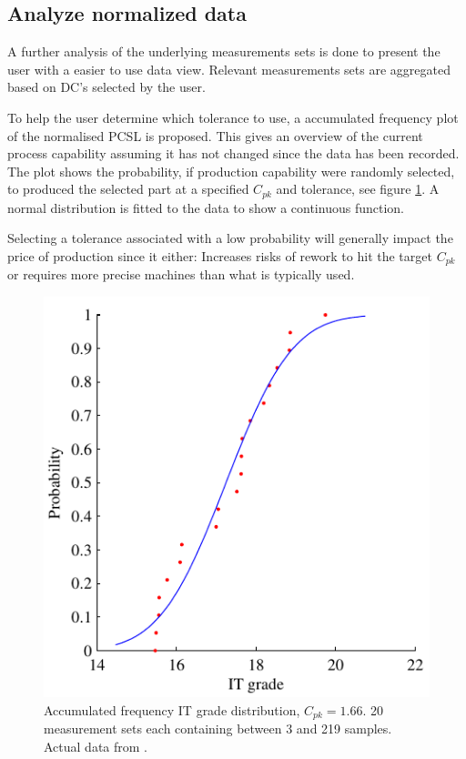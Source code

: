 \documentclass[aip,amsmath, reprint, author-year]{revtex4-1}
\begin{document}
\subsection{Analyze normalized data}
A further analysis of the underlying measurements sets is done to present the user with a easier to use data view. Relevant measurements sets are aggregated based on DC's selected by the user. 

To help the user determine which tolerance to use, a accumulated frequency plot of the normalised PCSL is proposed. 
This gives an overview of the current process capability assuming it has not changed since the data has been recorded. 
The plot shows the probability, if production capability were randomly selected, to produced the selected part at a specified $C_{pk}$ and tolerance, see figure \ref{fig:acumfreq}. 
A normal distribution is fitted to the data to show a continuous function.

Selecting a tolerance associated with a low probability will generally impact the price of production since it either: Increases risks of rework to hit the target $C_{pk}$ or requires more precise machines than what is typically used.

\begin{figure}
\includegraphics{Acum_freqIT.pdf}
\caption{\label{fig:acumfreq} Accumulated frequency IT grade distribution, $C_{pk} =1.66$. 
20 measurement sets each containing between 3 and 219 samples. Actual data from \cite{thornton2000use}. }
\end{figure}
\end{document}
